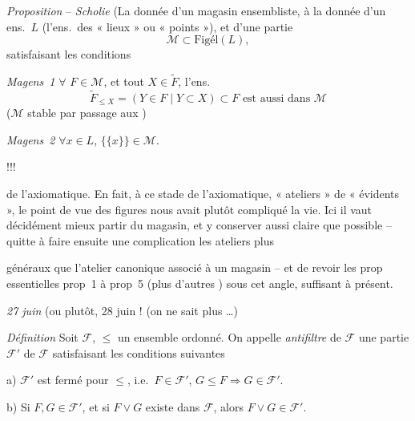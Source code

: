 \documentclass[11pt,a4paper]{article}
\begin{document}

\emph{Proposition} -- \emph{Scholie} (La donnée d'un magasin ensembliste,  à la donnée d'un ens.\ $L$ (l'ens.\ des « lieux » ou « points »), et d'une partie
\[
  \mathcal{M} \subset \mathrm{Figél}(L),
\]
satisfaisant les conditions

\emph{Magens~1} $\forall$  $F \in \mathcal{M}$, et tout  $X \in \widetilde{F}$, l'ens.
\[
  \widetilde{F}_{\leq X} = ( Y \in F \mid Y \subset X ) \subset F \text{ est aussi dans } \mathcal{M}
\]
($\mathcal{M}$ stable par passage aux \ill{} \ill{})

\emph{Magens~2} $\forall x \in L$, $\{\{x\}\} \in \mathcal{M}$.

\ill{}  !!!


\struck{\ill{}} \ill{} de l'axiomatique. En fait, à ce stade de l'axiomatique, \ill{} « ateliers » de « \ill{} évidents », le point de vue des figures nous avait plutôt compliqué la vie. Ici il vaut décidément mieux partir du magasin, et y conserver aussi claire que possible -- quitte à faire ensuite une  complication \ill{} les ateliers plus

généraux que l'atelier canonique associé à un magasin -- et de revoir les prop essentielles prop~1 à prop~5 (plus d'autres ) sous cet angle,  suffisant à présent.

\emph{27 juin} (ou plutôt, 28 juin ! (on ne sait plus …)

\emph{Définition} Soit $\mathcal{F}$, $\leq$ un ensemble ordonné. On appelle \emph{antifiltre} de $\mathcal{F}$ une partie $\mathcal{F}'$ de $\mathcal{F}$ satisfaisant les conditions suivantes

a) $\mathcal{F}'$ est fermé pour $\leq$, i.e.\ $F \in \mathcal{F}'$, $G \leq F \Rightarrow G \in \mathcal{F}'$.

b) Si $F, G \in \mathcal{F}'$, et si $F \vee G$ existe dans $\mathcal{F}$, alors $F \vee G \in \mathcal{F}'$.
\end{document}
